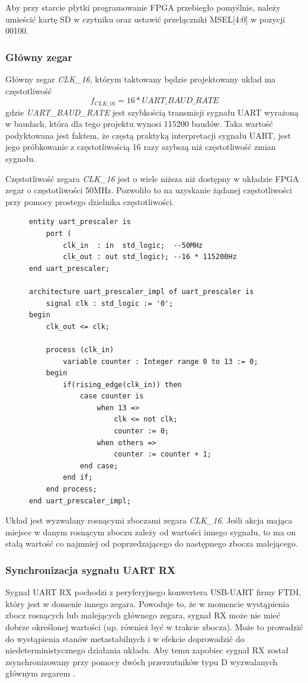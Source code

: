 Aby przy starcie płytki programowanie FPGA przebiegło pomyślnie, należy umieścić kartę SD w czytniku oraz ustawić przełączniki MSEL[4:0] w pozycji 00100.

\subsubsection{Główny zegar}
\label{clk-16}
Główny zegar \textit{CLK\_16}, którym taktowany będzie projektowany układ ma częstotliwość
\begin{equation}
f_{CLK\_16} = 16 * UART\_BAUD\_RATE
\end{equation}
gdzie \textit{UART\_BAUD\_RATE} jest szybkością transmisji sygnału UART wyrażoną w baudach, która dla tego projektu wynosi 115200 baudów. Taka wartość podyktowana jest faktem, że częstą praktyką interpretacji sygnału UART, jest jego próbkowanie z częstotliwością 16 razy szybszą niż częstotliwość zmian sygnału.

Częstotliwość zegara \textit{CLK\_16} jest o wiele niższa niż dostępny w układzie FPGA zegar o częstotliwości 50MHz. Pozwoliło to na uzyskanie żądanej częstotliwości przy pomocy prostego dzielnika częstotliwości.

\begin{figure}[!h]
\begin{lstlisting}[style=vhdl, caption={Dzielnik częstotliwości \textit{uart\_prescaler}}, captionpos=b]
entity uart_prescaler is
	port (
		clk_in  : in  std_logic;  --50MHz
		clk_out : out std_logic); --16 * 115200Hz
end uart_prescaler;

architecture uart_prescaler_impl of uart_prescaler is
	signal clk : std_logic := '0';
begin
	clk_out <= clk;
	
	process (clk_in) 
		variable counter : Integer range 0 to 13 := 0;
	begin	
		if(rising_edge(clk_in)) then
			case counter is
				when 13 =>
					clk <= not clk;
					counter := 0;
				when others =>
					counter := counter + 1;
			end case;
		end if;
	end process;
end uart_prescaler_impl;
\end{lstlisting}
\end{figure}

Układ jest wyzwalany rosnącymi zboczami zegara \textit{CLK\_16}. Jeśli akcja mająca miejsce w danym rosnącym zboczu zależy od wartości innego sygnału, to ma on stałą wartość co najmniej od poprzedzającego do następnego zbocza malejącego.

\subsubsection{Synchronizacja sygnału UART RX}
\label{uart-sync}
Sygnał UART RX pochodzi z peryferyjnego konwertera USB-UART firmy FTDI, który jest w domenie innego zegara. Powoduje to, że w momencie wystąpienia zbocz rosnących lub malejących głównego zegara, sygnał RX może nie mieć dobrze określonej wartości (np. również być w trakcie zbocza). Może to prowadzić do wystąpienia stanów metastabilnych \cite{altera-metastability} i w efekcie doprowadzić do niedeterministycznego działania układu. Aby temu zapobiec sygnał RX został zsynchronizowany przy pomocy dwóch przerzutników typu D wyzwalanych głównym zegarem \cite{altera-metastability, 2ff-synchronization}. 

